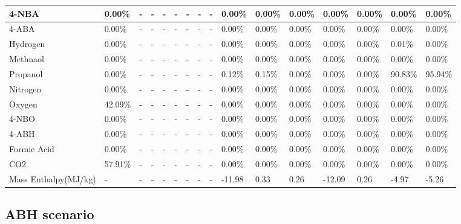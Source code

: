 \begin{landscape}
\begin{table}[H]
\begin{tabular}{|l|l|l|l|l|l|l|l|l|l|l|l|l|l|l|l|}
4-NBA                   & 0.00\%  & -    & -    & -    & -    & -    & -    & -    & 0.00\%  & 0.00\%  & 0.00\%  & 0.00\%  & 0.00\%  & 0.00\%  & 0.00\%  \\ \hline
4-ABA                   & 0.00\%  & -    & -    & -    & -    & -    & -    & -    & 0.00\%  & 0.00\%  & 0.00\%  & 0.00\%  & 0.00\%  & 0.00\%  & 0.00\%  \\ \hline
Hydrogen                & 0.00\%  & -    & -    & -    & -    & -    & -    & -    & 0.00\%  & 0.00\%  & 0.00\%  & 0.00\%  & 0.00\%  & 0.01\%  & 0.00\%  \\ \hline
Methnaol                & 0.00\%  & -    & -    & -    & -    & -    & -    & -    & 0.00\%  & 0.00\%  & 0.00\%  & 0.00\%  & 0.00\%  & 0.00\%  & 0.00\%  \\ \hline
Propanol                & 0.00\%  & -    & -    & -    & -    & -    & -    & -    & 0.12\%  & 0.15\%  & 0.00\%  & 0.00\%  & 0.00\%  & 90.83\% & 95.94\% \\ \hline
Nitrogen                & 0.00\%  & -    & -    & -    & -    & -    & -    & -    & 0.00\%  & 0.00\%  & 0.00\%  & 0.00\%  & 0.00\%  & 0.00\%  & 0.00\%  \\ \hline
Oxygen                  & 42.09\% & -    & -    & -    & -    & -    & -    & -    & 0.00\%  & 0.00\%  & 0.00\%  & 0.00\%  & 0.00\%  & 0.00\%  & 0.00\%  \\ \hline
4-NBO                   & 0.00\%  & -    & -    & -    & -    & -    & -    & -    & 0.00\%  & 0.00\%  & 0.00\%  & 0.00\%  & 0.00\%  & 0.00\%  & 0.00\%  \\ \hline
4-ABH                   & 0.00\%  & -    & -    & -    & -    & -    & -    & -    & 0.00\%  & 0.00\%  & 0.00\%  & 0.00\%  & 0.00\%  & 0.00\%  & 0.00\%  \\ \hline
Formic Acid             & 0.00\%  & -    & -    & -    & -    & -    & -    & -    & 0.00\%  & 0.00\%  & 0.00\%  & 0.00\%  & 0.00\%  & 0.00\%  & 0.00\%  \\ \hline
CO2                     & 57.91\% & -    & -    & -    & -    & -    & -    & -    & 0.00\%  & 0.00\%  & 0.00\%  & 0.00\%  & 0.00\%  & 0.00\%  & 0.00\%  \\ \hline
Mass Enthalpy(MJ/kg)    & -       & -    & -    & -    & -    & -    & -    & -    & -11.98  & 0.33    & 0.26    & -12.09  & 0.26    & -4.97   & -5.26   \\ \hline
\end{tabular}
\end{table}





\newpage
\subsection{ABH scenario}







\end{landscape}
